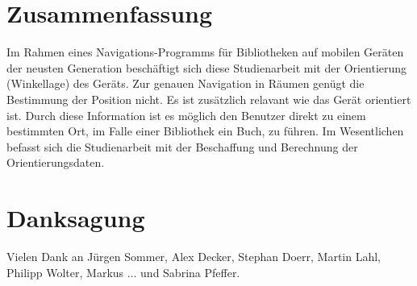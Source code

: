 \documentclass[twoside,12pt,a4paper]{report}
\begin{document}
\section*{Zusammenfassung}

Im Rahmen eines Navigations-Programms für Bibliotheken auf mobilen Geräten der neusten Generation beschäftigt sich diese Studienarbeit mit der Orientierung (Winkellage) des Geräts. Zur genauen Navigation in Räumen genügt die Bestimmung der Position nicht. Es ist zusätzlich relavant wie das Gerät orientiert ist. Durch diese Information ist es möglich den Benutzer direkt zu einem bestimmten Ort, im Falle einer Bibliothek ein Buch, zu führen. Im Wesentlichen befasst sich die Studienarbeit mit der Beschaffung und Berechnung der Orientierungsdaten.

\newpage
\section*{Danksagung}

Vielen Dank an Jürgen Sommer, Alex Decker, Stephan Doerr, Martin Lahl, Philipp Wolter, Markus ... und Sabrina Pfeffer.

\cleardoublepage


\renewcommand{\baselinestretch}{1.3}
\small\normalsize

\tableofcontents

\renewcommand{\baselinestretch}{1}
\small\normalsize

\cleardoublepage


\renewcommand{\baselinestretch}{1.3}
\small\normalsize

\listoffigures

\renewcommand{\baselinestretch}{1}
\small\normalsize

\cleardoublepage


\renewcommand{\baselinestretch}{1.3}
\small\normalsize
\end{document}
